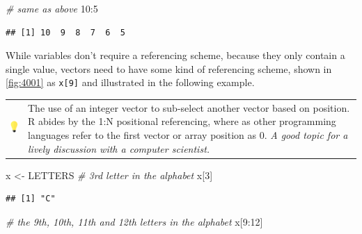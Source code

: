 \documentclass[
]{book}
\newenvironment{Shaded}{\begin{snugshade}}{\end{snugshade}}
\newcommand{\CommentTok}[1]{\textcolor[rgb]{0.56,0.35,0.01}{\textit{#1}}}
\newcommand{\DecValTok}[1]{\textcolor[rgb]{0.00,0.00,0.81}{#1}}
\newcommand{\NormalTok}[1]{#1}
\newcommand{\OtherTok}[1]{\textcolor[rgb]{0.56,0.35,0.01}{#1}}
\newcommand{\SpecialCharTok}[1]{\textcolor[rgb]{0.00,0.00,0.00}{#1}}
\begin{document}
\begin{Shaded}
\begin{Highlighting}[]
\CommentTok{\# same as above}
\DecValTok{10}\SpecialCharTok{:}\DecValTok{5}
\end{Highlighting}
\end{Shaded}

\begin{verbatim}
## [1] 10  9  8  7  6  5
\end{verbatim}

While variables don't require a referencing scheme, because they only contain a single value, vectors need to have some kind of referencing scheme, shown in \ref{fig:4001} as \texttt{x{[}9{]}} and illustrated in the following example.

\hfill\break

\begin{longtable}[]{@{}
  >{\raggedright\arraybackslash}p{}
  >{\raggedright\arraybackslash}p{}@{}}
\toprule\noalign{}
\endhead
\bottomrule\noalign{}
\endlastfoot
\includegraphics[width=\textwidth,height=0.70833in]{images/01.png} & The use of an integer vector to sub-select another vector based on position. R abides by the 1:N positional referencing, where as other programming languages refer to the first vector or array position as 0. \emph{A good topic for a lively discussion with a computer scientist.} \\
\end{longtable}

\hfill\break

\begin{Shaded}
\begin{Highlighting}[]
\NormalTok{x }\OtherTok{\textless{}{-}}\NormalTok{ LETTERS}
\CommentTok{\# 3rd letter in the alphabet}
\NormalTok{x[}\DecValTok{3}\NormalTok{]}
\end{Highlighting}
\end{Shaded}

\begin{verbatim}
## [1] "C"
\end{verbatim}

\begin{Shaded}
\begin{Highlighting}[]
\CommentTok{\# the 9th, 10th, 11th and 12th letters in the alphabet}
\NormalTok{x[}\DecValTok{9}\SpecialCharTok{:}\DecValTok{12}\NormalTok{]}
\end{Highlighting}
\end{Shaded}
\end{document}
